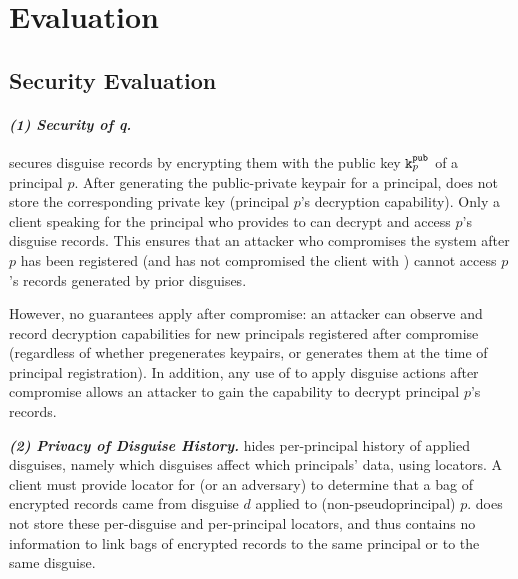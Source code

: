 \section{Evaluation}
\label{s:eval}


\subsection{Security Evaluation}
\label{s:eval-security}

\paragraph{\emph{(1) Security of q.}}
%
\sys secures disguise records by encrypting them with the public key $\texttt{\ensuremath{\texttt{k}^{\text{pub}}_{p}}}$ of a principal $p$.
After generating the public-private keypair for a principal, \sys does not store the corresponding
private key  (principal $p$'s decryption capability). Only a client speaking for the
principal who provides  to \sys can decrypt and access $p$'s disguise records.
This ensures that an attacker who compromises the system after $p$ has been registered (and has not
compromised the client with ) cannot access $p$'s records generated by prior disguises.

However, no guarantees apply after compromise: an attacker can observe and record decryption
capabilities for new principals registered after compromise (regardless of whether \sys pregenerates
keypairs, or generates them at the time of principal registration). In addition, any use of
 to apply disguise actions after compromise allows an attacker to gain the capability to
decrypt principal $p$'s records.
%

\vspace{6pt}\noindent\textbf{\emph{(2) Privacy of Disguise History.}}
%
\sys hides per-principal history of applied disguises, namely which disguises affect which
principals' data, using locators. A client must provide locator  for \sys (or an
adversary) to determine that a bag of encrypted records came from disguise $d$ applied to
(non-pseudoprincipal) $p$. \sys does not store these per-disguise and per-principal locators, and
thus contains no information to link bags of encrypted records to the same principal or to the
same disguise.

